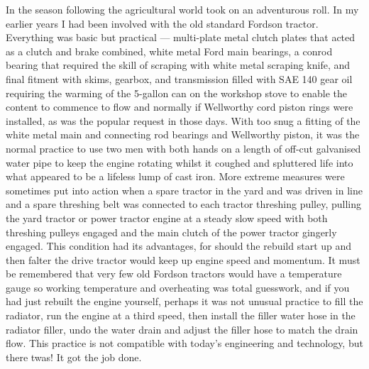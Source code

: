 In the season following the agricultural world took on an adventurous roll. In
my earlier years I had been involved with the old standard Fordson tractor.
Everything was basic but practical --- multi-plate metal clutch plates that
acted as a clutch and brake combined, white metal Ford main bearings, a conrod
bearing that required the skill of scraping with white metal scraping knife,
and final fitment with skims, gearbox, and transmission filled with SAE 140
gear oil requiring the warming of the 5-gallon can on the workshop stove to
enable the content to commence to flow and normally if Wellworthy cord piston
rings were installed, as was the popular request in those days. With too snug a
fitting of the white metal main and connecting rod bearings and Wellworthy
piston, it was the normal practice to use two men with both hands on a length
of off-cut galvanised water pipe to keep the engine rotating whilst it coughed
and spluttered life into what appeared to be a lifeless lump of cast iron. More
extreme measures were sometimes put into action when a spare tractor in the
yard and was driven in line and a spare threshing belt was connected to each
tractor threshing pulley, pulling the yard tractor or power tractor engine at a
steady slow speed with both threshing pulleys engaged and the main clutch of
the power tractor gingerly engaged. This condition had its advantages, for
should the rebuild start up and then falter the drive tractor would keep up
engine speed and momentum. It must be remembered that very few old Fordson
tractors would have a temperature gauge so working temperature and overheating
was total guesswork, and if you had just rebuilt the engine yourself, perhaps
it was not unusual practice to fill the radiator, run the engine at a third
speed, then install the filler water hose in the radiator filler, undo the
water drain and adjust the filler hose to match the drain flow. This practice
is not compatible with today's engineering and technology, but there twas! It
got the job done.

